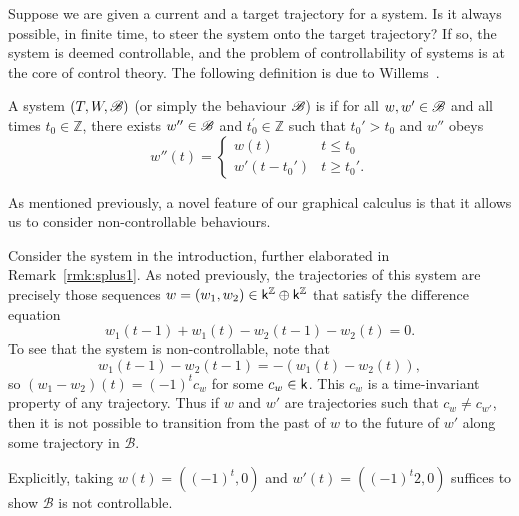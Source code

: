 Suppose we are given a current and a target trajectory for a system. Is it
always possible, in finite time, to steer the system onto the target trajectory? If so, the 
 system is deemed controllable, and the problem of controllability of systems is at
the core of control theory. The following definition is due to
Willems~\cite{Wi2}.

\begin{definition}\label{def:contr}
A system $(T,W,{\mathscr B})$ (or simply the behaviour ${\mathscr B}$) is  if
for all $w,w' \in {\mathscr B}$ and all times $t_0\in\mathbb{Z}$, there exists $w'' \in
{\mathscr B}$ and $t_0^\prime\in\mathbb{Z}$ such that $t_0'>t_0$ and $w''$ obeys
\[
  w''(t) = 
  \begin{cases} 
    w(t) & t \le t_0 \\
    w'(t-t_0') & t \ge t_0'.
  \end{cases}
\]
\end{definition}

As mentioned previously, a novel feature of our graphical calculus is
that it allows us to consider non-controllable behaviours.

\begin{example} \label{ex.noncontrol}
Consider the system in the introduction, further elaborated in Remark~\ref{rmk:splus1}.
%
As noted previously,
the trajectories of this system are
precisely those sequences $w= (w_1, w_2) \in \mathsf{k}^{\mathbb Z} \oplus \mathsf{k}^{\mathbb Z}$ that satisfy
the difference equation
\[
  w_1(t-1)+w_1(t)-w_2(t-1)-w_2(t)=0.
\]
To see that the system is non-controllable, note that
\[
  w_1(t-1)-w_2(t-1) = -(w_1(t)-w_2(t)),
\]
so $(w_1-w_2)(t) = (-1)^tc_w$ for some $c_w \in \mathsf{k}$. This $c_w$ is a time-invariant
property of any trajectory. Thus if $w$ and $w'$ are trajectories such that $c_w \ne
c_{w'}$, then it is not possible to transition from the past of $w$ to the
future of $w'$ along some trajectory in $\mathcal B$. 

Explicitly, taking $w(t) = ((-1)^t,0)$ and $w'(t) = ((-1)^t2,0)$ suffices to
show $\mathcal B$ is not controllable.
\end{example}

